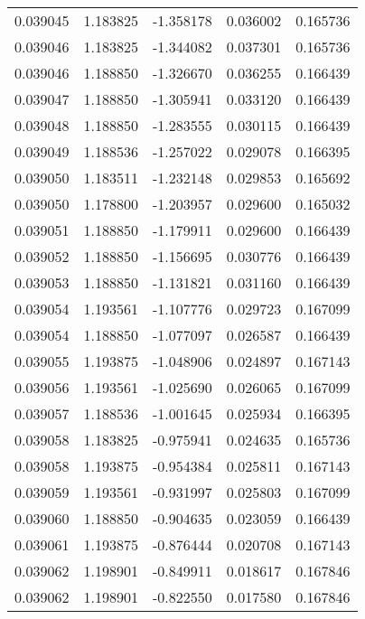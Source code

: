 \begin{tabular}{lrrrr}
0.039045    &  1.183825 & -1.358178 &  0.036002 &             0.165736 \\
0.039046    &  1.183825 & -1.344082 &  0.037301 &             0.165736 \\
0.039046    &  1.188850 & -1.326670 &  0.036255 &             0.166439 \\
0.039047    &  1.188850 & -1.305941 &  0.033120 &             0.166439 \\
0.039048    &  1.188850 & -1.283555 &  0.030115 &             0.166439 \\
0.039049    &  1.188536 & -1.257022 &  0.029078 &             0.166395 \\
0.039050    &  1.183511 & -1.232148 &  0.029853 &             0.165692 \\
0.039050    &  1.178800 & -1.203957 &  0.029600 &             0.165032 \\
0.039051    &  1.188850 & -1.179911 &  0.029600 &             0.166439 \\
0.039052    &  1.188850 & -1.156695 &  0.030776 &             0.166439 \\
0.039053    &  1.188850 & -1.131821 &  0.031160 &             0.166439 \\
0.039054    &  1.193561 & -1.107776 &  0.029723 &             0.167099 \\
0.039054    &  1.188850 & -1.077097 &  0.026587 &             0.166439 \\
0.039055    &  1.193875 & -1.048906 &  0.024897 &             0.167143 \\
0.039056    &  1.193561 & -1.025690 &  0.026065 &             0.167099 \\
0.039057    &  1.188536 & -1.001645 &  0.025934 &             0.166395 \\
0.039058    &  1.183825 & -0.975941 &  0.024635 &             0.165736 \\
0.039058    &  1.193875 & -0.954384 &  0.025811 &             0.167143 \\
0.039059    &  1.193561 & -0.931997 &  0.025803 &             0.167099 \\
0.039060    &  1.188850 & -0.904635 &  0.023059 &             0.166439 \\
0.039061    &  1.193875 & -0.876444 &  0.020708 &             0.167143 \\
0.039062    &  1.198901 & -0.849911 &  0.018617 &             0.167846 \\
0.039062    &  1.198901 & -0.822550 &  0.017580 &             0.167846 \\

\end{tabular}
